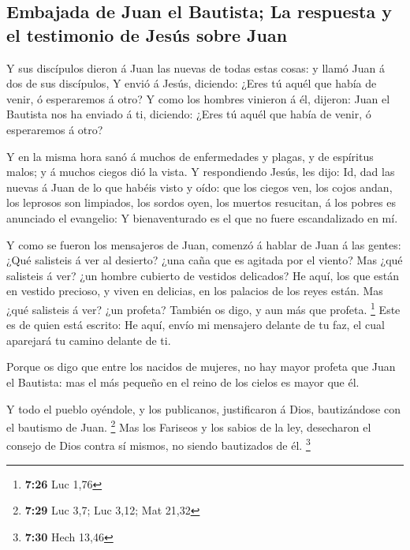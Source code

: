 \hypertarget{embajada-de-juan-el-bautista-la-respuesta-y-el-testimonio-de-jesuxfas-sobre-juan}{%
\subsection{Embajada de Juan el Bautista; La respuesta y el testimonio
de Jesús sobre
Juan}\label{embajada-de-juan-el-bautista-la-respuesta-y-el-testimonio-de-jesuxfas-sobre-juan}}

 Y sus discípulos dieron á Juan las nuevas de todas estas
cosas: y llamó Juan á dos de sus discípulos,  Y envió á
Jesús, diciendo: ¿Eres tú aquél que había de venir, ó esperaremos á
otro?  Y como los hombres vinieron á él, dijeron: Juan el
Bautista nos ha enviado á ti, diciendo: ¿Eres tú aquél que había de
venir, ó esperaremos á otro?

 Y en la misma hora sanó á muchos de enfermedades y
plagas, y de espíritus malos; y á muchos ciegos dió la vista.
 Y respondiendo Jesús, les dijo: Id, dad las nuevas á
Juan de lo que habéis visto y oído: que los ciegos ven, los cojos andan,
los leprosos son limpiados, los sordos oyen, los muertos resucitan, á
los pobres es anunciado el evangelio:  Y bienaventurado
es el que no fuere escandalizado en mí.

 Y como se fueron los mensajeros de Juan, comenzó á
hablar de Juan á las gentes: ¿Qué salisteis á ver al desierto? ¿una caña
que es agitada por el viento?  Mas ¿qué salisteis á ver?
¿un hombre cubierto de vestidos delicados? He aquí, los que están en
vestido precioso, y viven en delicias, en los palacios de los reyes
están.  Mas ¿qué salisteis á ver? ¿un profeta? También os
digo, y aun más que profeta. \footnote{\textbf{7:26} Luc 1,76}
 Este es de quien está escrito: He aquí, envío mi
mensajero delante de tu faz, el cual aparejará tu camino delante de ti.

 Porque os digo que entre los nacidos de mujeres, no hay
mayor profeta que Juan el Bautista: mas el más pequeño en el reino de
los cielos es mayor que él.

 Y todo el pueblo oyéndole, y los publicanos,
justificaron á Dios, bautizándose con el bautismo de Juan. \footnote{\textbf{7:29}
  Luc 3,7; Luc 3,12; Mat 21,32}  Mas los Fariseos y los
sabios de la ley, desecharon el consejo de Dios contra sí mismos, no
siendo bautizados de él. \footnote{\textbf{7:30} Hech 13,46}

